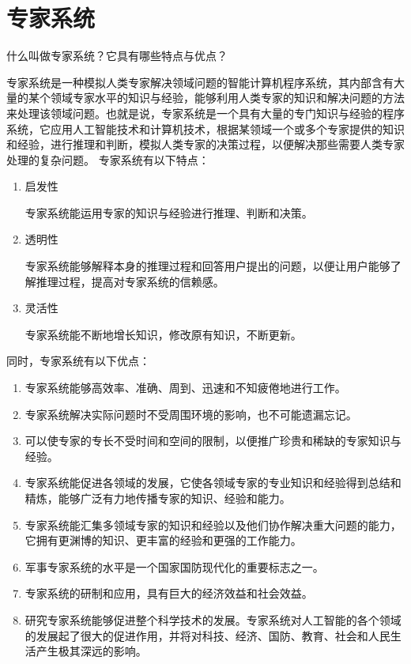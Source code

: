 \chapter{专家系统}

\begin{question}
什么叫做专家系统？它具有哪些特点与优点？
\end{question}
\begin{solution}
专家系统是一种模拟人类专家解决领域问题的智能计算机程序系统，其内部含有大量的某个领域专家水平的知识与经验，能够利用人类专家的知识和解决问题的方法来处理该领域问题。也就是说，专家系统是一个具有大量的专门知识与经验的程序系统，它应用人工智能技术和计算机技术，根据某领域一个或多个专家提供的知识和经验，进行推理和判断，模拟人类专家的决策过程，以便解决那些需要人类专家处理的复杂问题。
专家系统有以下特点：
	\begin{enumerate}
		\item 启发性 \par
		专家系统能运用专家的知识与经验进行推理、判断和决策。
		\item 透明性 \par
		专家系统能够解释本身的推理过程和回答用户提出的问题，以便让用户能够了解推理过程，提高对专家系统的信赖感。 
		\item 灵活性 \par
		专家系统能不断地增长知识，修改原有知识，不断更新。
	\end{enumerate} \par
同时，专家系统有以下优点：
	\begin{enumerate}
		\item 专家系统能够高效率、准确、周到、迅速和不知疲倦地进行工作。
		\item 专家系统解决实际问题时不受周围环境的影响，也不可能遗漏忘记。
		\item 可以使专家的专长不受时间和空间的限制，以便推广珍贵和稀缺的专家知识与经验。
		\item 专家系统能促进各领域的发展，它使各领域专家的专业知识和经验得到总结和精炼，能够广泛有力地传播专家的知识、经验和能力。
		\item 专家系统能汇集多领域专家的知识和经验以及他们协作解决重大问题的能力，它拥有更渊博的知识、更丰富的经验和更强的工作能力。
		\item 军事专家系统的水平是一个国家国防现代化的重要标志之一。
		\item 专家系统的研制和应用，具有巨大的经济效益和社会效益。 
		\item 研究专家系统能够促进整个科学技术的发展。专家系统对人工智能的各个领域的发展起了很大的促进作用，并将对科技、经济、国防、教育、社会和人民生活产生极其深远的影响。
	\end{enumerate}
\end{solution}


